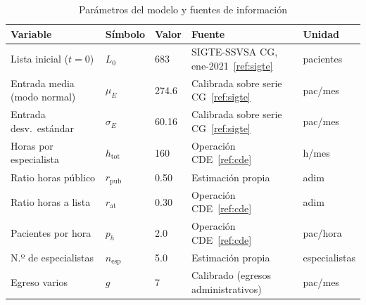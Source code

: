 \documentclass[12pt,a4paper]{article}
\begin{document}
\begin{table}[H]
  \centering
  \caption{Parámetros del modelo y fuentes de información}
  \label{tab:parametros}
  \begin{tabularx}{\textwidth}{@{}p{4.6cm}p{2cm}p{1.7cm}Xp{2.1cm}@{}}
    \toprule
    \rowcolor{azulDS!15}
    \textbf{Variable}                        & \textbf{Símbolo}    & \textbf{Valor} & \textbf{Fuente} & \textbf{Unidad} \\
    \midrule
    Lista inicial ($t{=}0$)                  & $L_0$               & 683            &
    SIGTE-SSVSA CG, ene-2021~\ref{ref:sigte} & pacientes                                                                \\[3pt]
    Entrada media (modo normal)              & $\mu_E$             & 274.6          &
    Calibrada sobre serie CG~\ref{ref:sigte} & pac/mes                                                                  \\[3pt]
    Entrada desv.\ estándar                  & $\sigma_E$          & 60.16          &
    Calibrada sobre serie CG~\ref{ref:sigte} & pac/mes                                                                  \\[3pt]
    Horas por especialista                   & $h_{\text{tot}}$    & 160            &
    Operación CDE~\ref{ref:cde}              & h/mes                                                                    \\[3pt]
    Ratio horas público                      & $r_{\text{pub}}$    & 0.50           &
    Estimación propia                        & adim                                                                     \\[3pt]
    Ratio horas a lista                      & $r_{\text{at}}$     & 0.30           &
    Operación CDE~\ref{ref:cde}              & adim                                                                     \\[3pt]
    Pacientes por hora                       & $p_h$               & 2.0            &
    Operación CDE~\ref{ref:cde}              & pac/hora                                                                 \\[3pt]
    N.º de especialistas                     & $n_{\text{esp}}$    & 5.0            &
    Estimación propia                        & especialistas                                                            \\[3pt]
    Egreso varios                            & $g$                 & 7              &
    Calibrado (egresos administrativos)      & pac/mes                                                                  \\[3pt]

\end{tabularx}
\end{table}
\end{document}
